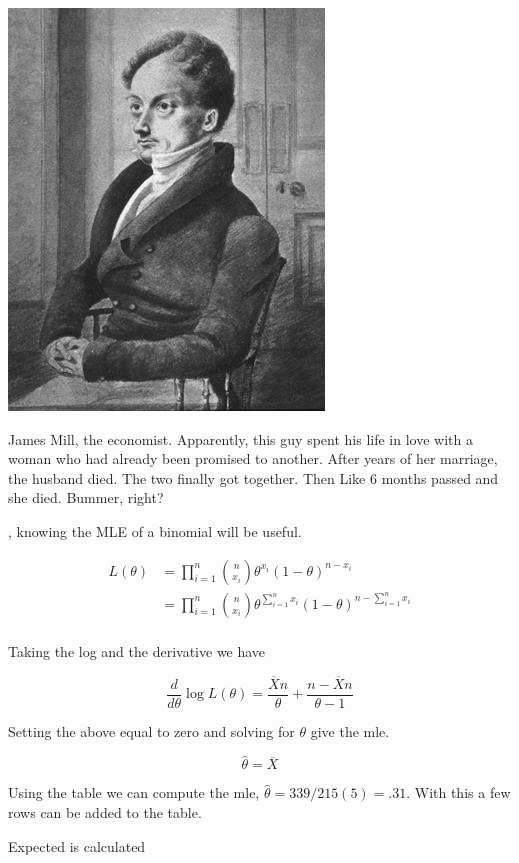\documentclass{tufte-book}
\theoremstyle{mytheoremstyle}
\theoremstyle{mylemstyle}
\theoremstyle{mydefstyle}
\begin{document}
\begin{marginfigure}
\includegraphics{James_Mill}
\caption{James Mill, the economist.  Apparently, this guy spent his life in love with a woman who had already been promised to another.  After years of her marriage, the husband died.  The two finally got together.  Then Like 6 months passed and she died.  Bummer, right?}
\end{marginfigure}

, knowing the MLE of a binomial will be useful.

\begin{align*}
L(\theta) &= \prod_{i=1}^n \binom{n}{x_i} \theta^{x_i}(1-\theta)^{n-x_i} \\
&= \prod_{i=1}^n \binom{n}{x_i} \theta^{\sum_{i=1}^n x_i}(1-\theta)^{n- \sum_{i=1}^n x_i}\\
\end{align*}

Taking the log and the derivative we have

\[ \frac{d}{d\theta} \log L(\theta) = \frac{\overline{X}n}{\theta} + \frac{n- \overline{X}n}{\theta - 1} \]

Setting the above equal to zero and solving for $\theta$ give the mle.

\[ \hat{\theta} = \overline{X} \]

Using the table we can compute the mle, $\hat{\theta} = 339/215(5) = .31$.  With this a few rows can be added to the table.

Expected is calculated
\end{document}
